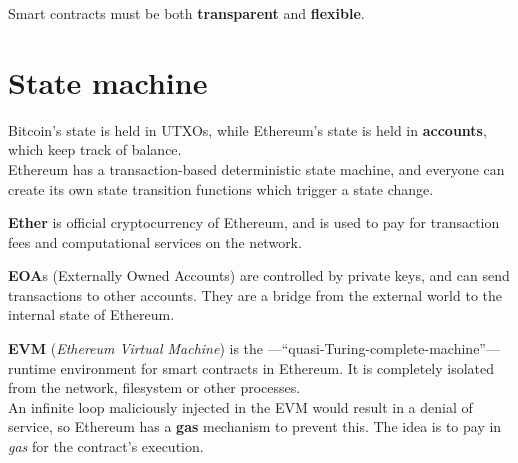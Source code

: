 Smart contracts must be both \textbf{transparent} and \textbf{flexible}.


\section{State machine}
Bitcoin's state is held in UTXOs, while Ethereum's state is held in \textbf{accounts}, which keep track of balance.\\
Ethereum has a transaction-based deterministic state machine, and everyone can create its own state transition functions which trigger a state change.


\textbf{Ether} is official cryptocurrency of Ethereum, and is used to pay for transaction fees and computational services on the network.

\textbf{EOA}s (Externally Owned Accounts) are controlled by private keys, and can send transactions to other accounts. They are a bridge from the external world to the internal state of Ethereum.

\textbf{EVM} (\textit{Ethereum Virtual Machine}) is the ---``quasi-Turing-complete-machine''--- runtime environment for smart contracts in Ethereum. It is completely isolated from the network, filesystem or other processes.\\
An infinite loop maliciously injected in the EVM would result in a denial of service, so Ethereum has a \textbf{gas} mechanism to prevent this.
The idea is to pay in \textit{gas} for the contract's execution.

